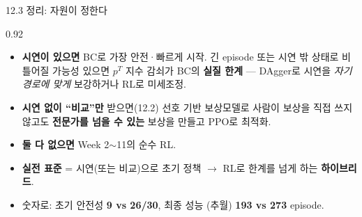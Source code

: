 \begin{frame}{12.3 정리: 자원이 정한다}
\begin{center}\begin{varwidth}{0.92\textwidth}
  \begin{itemize}
    \item \textbf{시연이 있으면} BC로 가장 안전·빠르게 시작. 긴
      episode 또는 시연 밖 상태로 비틀어질 가능성 있으면 $p^T$
      지수 감쇠가 BC의 \textbf{실질 한계} — DAgger로 시연을
      \textit{자기 경로에 맞게} 보강하거나 RL로 미세조정.
    \item \textbf{시연 없이 ``비교''만} 받으면(12.2) 선호 기반
      보상모델로 사람이 보상을 직접 쓰지 않고도 \textbf{전문가를
      넘을 수 있는} 보상을 만들고 PPO로 최적화.
    \item \textbf{둘 다 없으면} Week 2$\sim$11의 순수 RL.
    \item \textbf{실전 표준} = 시연(또는 비교)으로 초기 정책
      $\to$ RL로 한계를 넘게 하는 \textbf{하이브리드}.
    \item 숫자로: 초기 안전성 \textbf{9 vs 26/30}, 최종 성능
      (추월) \textbf{193 vs 273} episode.
  \end{itemize}
\end{varwidth}\end{center}
\end{frame}
